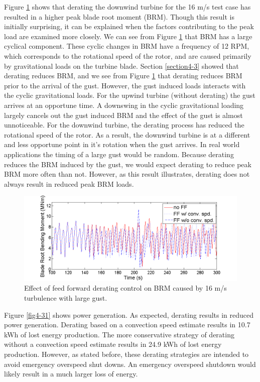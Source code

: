 Figure \ref{fig4-30} shows that derating the downwind turbine for the 16 m/s test case has resulted in a higher peak blade root moment (BRM). Though this result is initially surprising, it can be explained when the factors contributing to the peak load are examined more closely. We can see from Figure \ref{fig4-30} that BRM has a large cyclical component. These cyclic changes in BRM have a frequency of 12 RPM, which corresponds to the rotational speed of the rotor, and are caused primarily by gravitational loads on the turbine blade. Section \ref{section4-3} showed that derating reduces BRM, and we see from Figure \ref{fig4-30} that derating reduces BRM prior to the arrival of the gust. However, the gust induced loads interacts with the cyclic gravitational loads. For the upwind turbine (without derating) the gust arrives at an opportune time. A downswing in the cyclic gravitational loading largely cancels out the gust induced BRM and the effect of the gust is almost unnoticeable. For the downwind turbine, the derating process has reduced the rotational speed of the rotor. As a result, the downwind turbine is at a different and less opportune point in it's rotation when the gust arrives. In real world applications the timing of a large gust would be random. Because derating reduces the BRM induced by the gust, we would expect derating to reduce peak BRM more often than not. However, as this result illustrates, derating does not always result in reduced peak BRM loads.

\begin{figure}[htb]
	\centering
		\includegraphics[width = \linewidth]{Figures/ch4Figures/fig4-30.png}
		
	\caption{Effect of feed forward derating control on BRM caused by 16 m/s turbulence with large gust.}
	\label{fig4-30}
\end{figure}

Figure \ref{fig4-31} shows power generation. As expected, derating results in reduced power generation. Derating based on a convection speed estimate results in 10.7 kWh of lost energy production. The more conservative strategy of derating without a convection speed estimate results in 24.9 kWh of lost energy production. However, as stated before, these derating strategies are intended to avoid emergency overspeed shut downs. An emergency overspeed shutdown would likely result in a much larger loss of energy.

